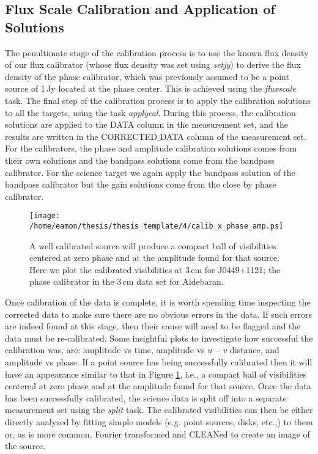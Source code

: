 \subsection{Flux Scale Calibration and Application of Solutions}\label{subsec:2.4}
The penultimate stage of the calibration process is to use the known flux density of our flux calibrator (whose flux density was set using \textit{setjy}) to derive the flux density of the phase calibrator, which was previously assumed to be a point source of 1\,Jy located at the phase center. This is achieved using the \textit{fluxscale} task. The final step of the calibration process is to apply the calibration solutions to all the targets, using the task \textit{applycal}. During this process, the calibration solutions are applied to the DATA column in the measurement set, and the results are written in the CORRECTED$\_$DATA column of the measurement set. For the calibrators, the phase and amplitude calibration solutions comes from their own solutions and the bandpass solutions come from the bandpass calibrator. For the science target we again apply the bandpass solution of the bandpass calibrator but the gain solutions come from the close by phase calibrator.

\begin{figure}[hbt!]
\centering 
\texttt{[image: /home/eamon/thesis/thesis\_template/4/calib\_x\_phase\_amp.ps]}  
\caption[Example of a well calibrated source.]{A well calibrated source will produce a compact ball of visibilities centered at zero phase and at the amplitude found for that source. Here we plot the calibrated visibilities at 3\,cm for J0449+1121; the phase calibrator in the 3\,cm data set for Aldebaran.}
\label{fig:4.6}
\end{figure}

Once calibration of the data is complete, it is worth spending time inspecting the corrected data to make sure there are no obvious errors in the data. If such errors are indeed found at this stage, then their cause will need to be flagged and the data must be re-calibrated. Some insightful plots to investigate how successful the calibration was, are: amplitude vs time, amplitude vs $u-v$ distance, and amplitude vs phase. If a point source has being successfully calibrated then it will have an appearance similar to that in Figure \ref{fig:4.6}, i.e., a compact ball of visibilities centered at zero phase and at the amplitude found for that source. Once the data has been successfully calibrated, the science data is split off into a separate measurement set using the \textit{split} task. The calibrated visibilities can then be either directly analyzed by fitting simple models (e.g. point sources, disks, etc.,) to them or, as is more common, Fourier transformed and CLEANed to create an image of the source.

